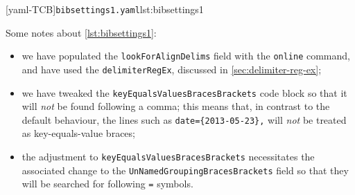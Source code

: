 \begin{example}
 \begin{widepage}
  \begin{cmhtcbraster}[raster column skip=.1\linewidth]
   [yaml-TCB]{\texttt{bibsettings1.yaml}}{lst:bibsettings1}
  \end{cmhtcbraster}
 \end{widepage}
 Some notes about \cref{lst:bibsettings1}:
 \begin{itemize}
  \item we have populated the \texttt{lookForAlignDelims} field with the \texttt{online}
        command, and have used the \texttt{delimiterRegEx}, discussed in
        \vref{sec:delimiter-reg-ex};
  \item we have tweaked the \texttt{keyEqualsValuesBracesBrackets} code block so that it
        will \emph{not} be found following a comma; this means that, in contrast to the
        default behaviour, the lines such as \lstinline!date={2013-05-23},! will
        \emph{not} be treated as key-equals-value braces;
  \item the adjustment to \texttt{keyEqualsValuesBracesBrackets} necessitates the
        associated change to the \texttt{UnNamedGroupingBracesBrackets} field so that
        they will be searched for following \texttt{=} symbols.
 \end{itemize}
 \end{example}

